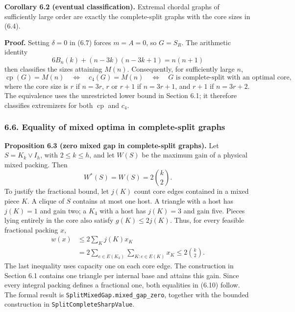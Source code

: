\documentclass[english,11pt,a4paper]{article}
\begin{document}

\textbf{Corollary 6.2 (eventual classification).} Extremal chordal graphs of sufficiently large order are exactly the complete-split graphs with the core sizes in (6.4).

\textbf{Proof.} Setting \(\delta=0\) in (6.7) forces \(m=A=0\), so \(G=S_R\). The arithmetic identity \[
6B_n(k)+(n-3k)(n-3k+1)=n(n+1)
\tag{6.8}
\] then classifies the sizes attaining \(M(n)\). Consequently, for sufficiently large \(n\), \[
\operatorname{cp}(G)=M(n)
\quad\Longleftrightarrow\quad
c_4(G)=M(n)
\quad\Longleftrightarrow\quad
G\text{ is complete-split with an optimal core},
\tag{6.9}
\] where the core size is \(r\) if \(n=3r\), \(r\) or \(r+1\) if \(n=3r+1\), and \(r+1\) if \(n=3r+2\). The equivalence uses the unrestricted lower bound in Section 6.1; it therefore classifies extremizers for both \(\operatorname{cp}\) and \(c_4\).


\subsubsection{6.6. Equality of mixed optima in complete-split graphs}\label{equality-of-mixed-optima-in-complete-split-graphs}


\textbf{Proposition 6.3 (zero mixed gap in complete-split graphs).} Let \(S=K_k\vee I_h\), with \(2\le k\le h\), and let \(W(S)\) be the maximum gain of a physical mixed packing. Then \[
W^*(S)=W(S)=2\binom k2.
\tag{6.10}
\] To justify the fractional bound, let \(j(K)\) count core edges contained in a mixed piece \(K\). A clique of \(S\) contains at most one host. A triangle with a host has \(j(K)=1\) and gain two; a \(K_4\) with a host has \(j(K)=3\) and gain five. Pieces lying entirely in the core also satisfy \(g(K)\le2j(K)\). Thus, for every feasible fractional packing \(x\), \[
\begin{aligned}
w(x)&\le2\sum_K j(K)x_K\\
&=2\sum_{e\in E(K_k)}\sum_{K:e\in E(K)}x_K
\le2\binom k2.
\end{aligned}
\tag{6.11}
\] The last inequality uses capacity one on each core edge. The construction in Section 6.1 contains one triangle per internal base and attains this gain. Since every integral packing defines a fractional one, both equalities in (6.10) follow. The formal result is \nolinkurl{SplitMixedGap.mixed_gap_zero}, together with the bounded construction in \nolinkurl{SplitCompleteSharpValue}.
\end{document}
